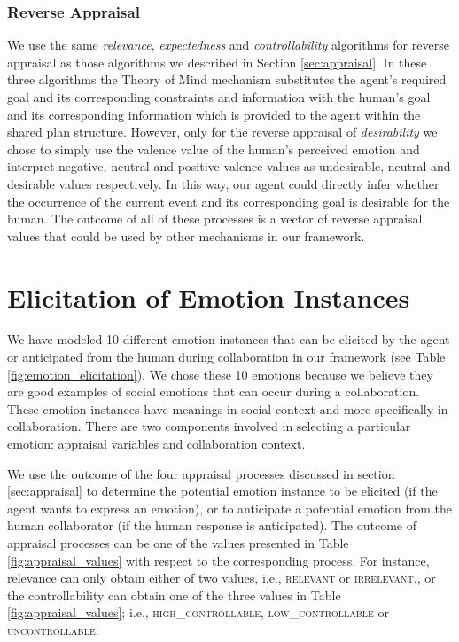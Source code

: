 \documentclass[12pt]{report}
\begin{document}
\subsubsection{Reverse Appraisal}
We use the same \textit{relevance}, \textit{expectedness} and
\textit{controllability} algorithms for reverse appraisal as those
algorithms we described in Section \ref{sec:appraisal}. In these three
algorithms the Theory of Mind mechanism substitutes the agent's required goal
and its corresponding constraints and information with the human's goal and its
corresponding information which is provided to the agent within the shared plan
structure.  However, only for the reverse appraisal of \textit{desirability} we
chose to simply use the valence value of the human's perceived emotion and
interpret negative, neutral and positive valence values as undesirable, neutral
and desirable values respectively. In this way, our agent could directly infer
whether the occurrence of the current event and its corresponding goal is
desirable for the human. The outcome of all of these processes is a vector of
reverse appraisal values that could be used by other mechanisms in our
framework.

\section{Elicitation of Emotion Instances}
We have modeled 10 different emotion instances that can be elicited by the agent
or anticipated from the human during collaboration in our framework (see Table
\ref{fig:emotion_elicitation}). We chose these 10 emotions because
we believe they are good examples of social emotions that can occur during a
collaboration. These emotion instances have meanings in social context and more
specifically in collaboration. There are two components involved in selecting a
particular emotion: appraisal variables and collaboration context.

We use the outcome of the four appraisal processes discussed in section
\ref{sec:appraisal} to determine the potential emotion instance to be elicited
(if the agent wants to express an emotion), or to anticipate a potential emotion
from the human collaborator (if the human response is anticipated). The outcome
of appraisal processes can be one of the values presented in Table
\ref{fig:appraisal_values} with respect to the corresponding process.
For instance, relevance can only obtain either of two values,
i.e., \textsc{relevant} or \textsc{irrelevant}., or the controllability can
obtain one of the three values in Table \ref{fig:appraisal_values}; i.e.,
\textsc{high\_controllable, low\_controllable} or \textsc{uncontrollable}.
\end{document}
